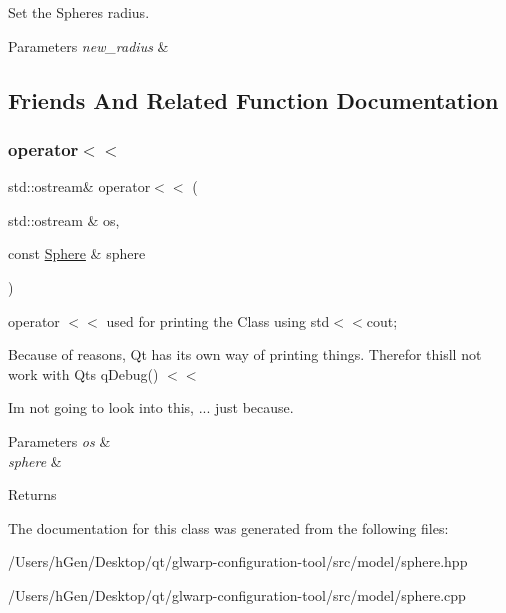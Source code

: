 Set the Spheres radius. 


\begin{DoxyParams}{Parameters}
{\em new\+\_\+radius} & \\
\hline
\end{DoxyParams}


\subsection{Friends And Related Function Documentation}
\mbox{\label{class_sphere_adeb07662f568bb893f87459c082f00b2}} 
\subsubsection{\texorpdfstring{operator$<$$<$}{operator<<}}
{\footnotesize\ttfamily std\+::ostream\& operator$<$$<$ (\begin{DoxyParamCaption}\item[{std\+::ostream \&}]{os,  }\item[{const \mbox{\hyperlink{class_sphere}{Sphere}} \&}]{sphere }\end{DoxyParamCaption})\hspace{0.3cm}{\ttfamily [friend]}}



operator $<$$<$ used for printing the Class using std$<$$<$cout; 

Because of reasons, Qt has its own way of printing things. Therefor this\textquotesingle{}ll not work with Qt\textquotesingle{}s q\+Debug() $<$$<$

I\textquotesingle{}m not going to look into this, ... just because.


\begin{DoxyParams}{Parameters}
{\em os} & \\
\hline
{\em sphere} & \\
\hline
\end{DoxyParams}
\begin{DoxyReturn}{Returns}

\end{DoxyReturn}


The documentation for this class was generated from the following files\+:\begin{DoxyCompactItemize}
\item 
/\+Users/h\+Gen/\+Desktop/qt/glwarp-\/configuration-\/tool/src/model/sphere.\+hpp\item 
/\+Users/h\+Gen/\+Desktop/qt/glwarp-\/configuration-\/tool/src/model/sphere.\+cpp\end{DoxyCompactItemize}
